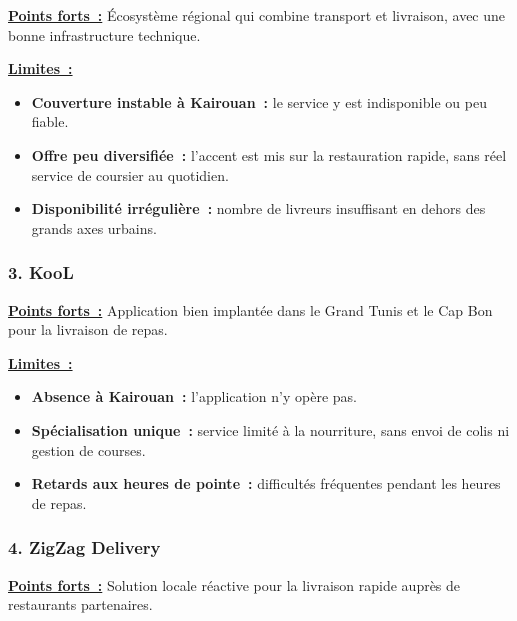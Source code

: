 \documentclass[12pt,fleqn,a4paper]{report}
\begin{document}
\begin{justify}
\noindent \textbf{\underline{Points forts~:}}
Écosystème régional qui combine transport et livraison, avec une bonne infrastructure technique.

\vspace{0.2cm}
\noindent \textbf{\underline{Limites~:}}
\begin{itemize}
    \item \textbf{Couverture instable à Kairouan~:} le service y est indisponible ou peu fiable.
    \item \textbf{Offre peu diversifiée~:} l'accent est mis sur la restauration rapide, sans réel service de coursier au quotidien.
    \item \textbf{Disponibilité irrégulière~:} nombre de livreurs insuffisant en dehors des grands axes urbains.
\end{itemize}

\vspace{0.4cm}

\subsubsection*{\Large \textbf{3. KooL}}
\vspace{0.2cm}

\noindent \textbf{\underline{Points forts~:}}
Application bien implantée dans le Grand Tunis et le Cap Bon pour la livraison de repas.

\vspace{0.2cm}
\noindent \textbf{\underline{Limites~:}}
\begin{itemize}
    \item \textbf{Absence à Kairouan~:} l'application n'y opère pas.
    \item \textbf{Spécialisation unique~:} service limité à la nourriture, sans envoi de colis ni gestion de courses.
    \item \textbf{Retards aux heures de pointe~:} difficultés fréquentes pendant les heures de repas.
\end{itemize}

\vspace{0.4cm}

\subsubsection*{\Large \textbf{4. ZigZag Delivery}}
\vspace{0.2cm}

\noindent \textbf{\underline{Points forts~:}}
Solution locale réactive pour la livraison rapide auprès de restaurants partenaires.


\end{justify}
\end{document}
